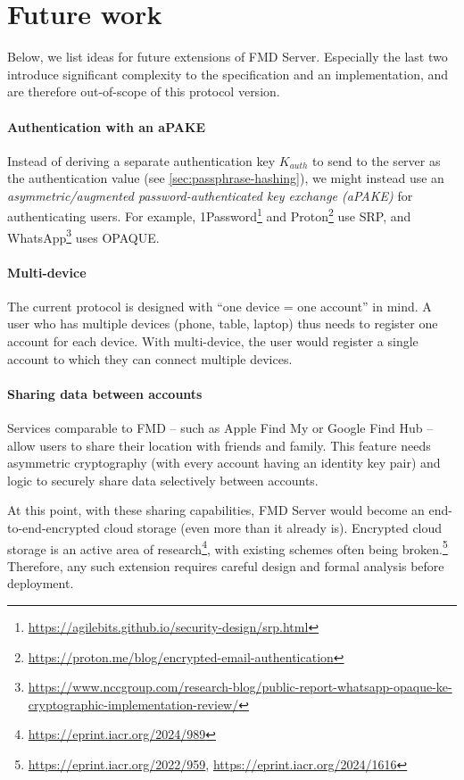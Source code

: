 \documentclass[11pt,a4paper]{article}
\begin{document}
\newpage

\section{Future work}\label{sec:future-work}

Below, we list ideas for future extensions of FMD Server.
Especially the last two introduce significant complexity to the specification and an implementation,
and are therefore out-of-scope of this protocol version.

\paragraph{Authentication with an aPAKE}
Instead of deriving a separate authentication key $K_{auth}$ to send to the server as
the authentication value (see \autoref{sec:passphrase-hashing}),
we might instead use an \emph{asymmetric/augmented password-authenticated key exchange (aPAKE)}
for authenticating users.
For example, 1Password\footnote{\url{https://agilebits.github.io/security-design/srp.html}}
and Proton\footnote{\url{https://proton.me/blog/encrypted-email-authentication}} use SRP,
and WhatsApp\footnote{\url{https://www.nccgroup.com/research-blog/public-report-whatsapp-opaque-ke-cryptographic-implementation-review/}}
uses OPAQUE.

\paragraph{Multi-device}
The current protocol is designed with ``one device = one account'' in mind.
A user who has multiple devices (phone, table, laptop) thus needs to register one account for each device.
With multi-device, the user would register a single account to which they can connect multiple devices.

\paragraph{Sharing data between accounts}
Services comparable to FMD -- such as Apple Find My or Google Find Hub --
allow users to share their location with friends and family.
This feature needs asymmetric cryptography (with every account having an identity key pair)
and logic to securely share data selectively between accounts.

At this point, with these sharing capabilities, FMD Server would become
an end-to-end-encrypted cloud storage (even more than it already is).
Encrypted cloud storage is an active area of research\footnote{\url{https://eprint.iacr.org/2024/989}},
with existing schemes often being broken.\footnote{\url{https://eprint.iacr.org/2022/959}, \url{https://eprint.iacr.org/2024/1616}}
Therefore, any such extension requires careful design and formal analysis before deployment.
\end{document}
